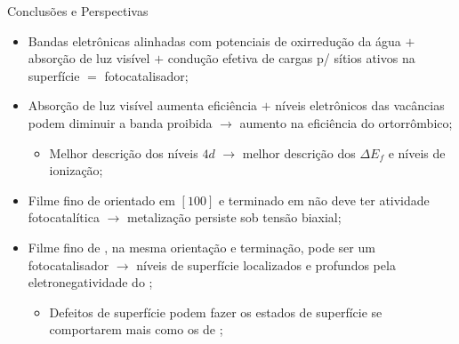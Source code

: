 \begin{frame}{Conclusões e Perspectivas}
	\begin{itemize}
		\item Bandas eletrônicas alinhadas com potenciais de oxirredução da água $+$ absorção de luz visível $+$ condução efetiva de cargas p/ sítios ativos na superfície $=$ fotocatalisador;
		\item Absorção de luz visível aumenta eficiência $+$ níveis eletrônicos das vacâncias podem diminuir a banda proibida $\to$ aumento na eficiência do  ortorrômbico;
		\begin{itemize}
			\item Melhor descrição dos níveis  $4d$ $\to$ melhor descrição dos $\Delta E_f$ e níveis de ionização;
		\end{itemize}
		\item Filme fino de  orientado em $[100]$ e terminado em  não deve ter atividade fotocatalítica $\to$ metalização persiste sob tensão biaxial;
		\item Filme fino de , na mesma orientação e terminação, pode ser um fotocatalisador $\to$ níveis de superfície localizados e profundos pela eletronegatividade do ;
		\begin{itemize}
			\item Defeitos de superfície podem fazer os estados de superfície  se comportarem mais como os de ;
		\end{itemize}
	\end{itemize}
\end{frame}
